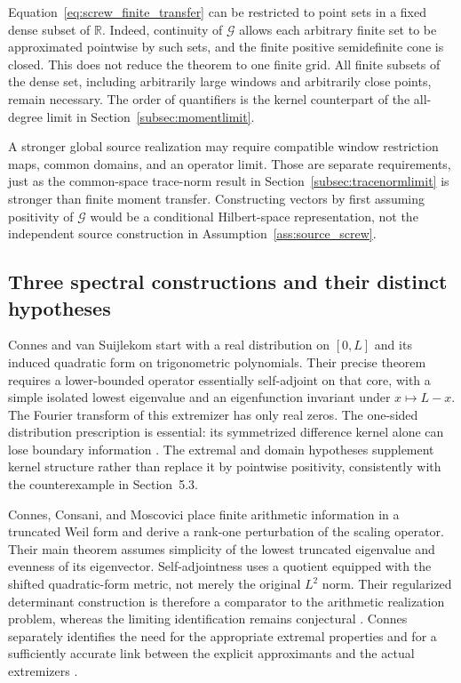 \documentclass[11pt,letterpaper]{article}
\numberwithin{equation}{section}
\theoremstyle{definition}
\theoremstyle{remark}
\newcommand{\R}{\mathbb R}
\begin{document}
Equation~\eqref{eq:screw_finite_transfer} can be restricted to point sets in a fixed dense subset of $\R$. Indeed, continuity of $\mathscr G$ allows each arbitrary finite set to be approximated pointwise by such sets, and the finite positive semidefinite cone is closed. This does not reduce the theorem to one finite grid. All finite subsets of the dense set, including arbitrarily large windows and arbitrarily close points, remain necessary. The order of quantifiers is the kernel counterpart of the all-degree limit in Section~\ref{subsec:momentlimit}.

A stronger global source realization may require compatible window restriction maps, common domains, and an operator limit. Those are separate requirements, just as the common-space trace-norm result in Section~\ref{subsec:tracenormlimit} is stronger than finite moment transfer. Constructing vectors by first assuming positivity of $\mathscr G$ would be a conditional Hilbert-space representation, not the independent source construction in Assumption~\ref{ass:source_screw}.

\subsection{Three spectral constructions and their distinct hypotheses}
\label{subsec:recentweilspectra}
Connes and van Suijlekom start with a real distribution on $[0,L]$ and its induced quadratic form on trigonometric polynomials. Their precise theorem requires a lower-bounded operator essentially self-adjoint on that core, with a simple isolated lowest eigenvalue and an eigenfunction invariant under $x\mapsto L-x$. The Fourier transform of this extremizer has only real zeros. The one-sided distribution prescription is essential: its symmetrized difference kernel alone can lose boundary information \cite[Theorem~6.1 and Remark~4.3]{connesvansuijlekom2025}. The extremal and domain hypotheses supplement kernel structure rather than replace it by pointwise positivity, consistently with the counterexample in Section~5.3.

Connes, Consani, and Moscovici place finite arithmetic information in a truncated Weil form and derive a rank-one perturbation of the scaling operator. Their main theorem assumes simplicity of the lowest truncated eigenvalue and evenness of its eigenvector. Self-adjointness uses a quotient equipped with the shifted quadratic-form metric, not merely the original $L^2$ norm. Their regularized determinant construction is therefore a comparator to the arithmetic realization problem, whereas the limiting identification remains conjectural \cite[Theorem~1.1 and Sections~7--8]{connesconsanim2025}. Connes separately identifies the need for the appropriate extremal properties and for a sufficiently accurate link between the explicit approximants and the actual extremizers \cite[Section~6.6]{connes2026}.
\end{document}
